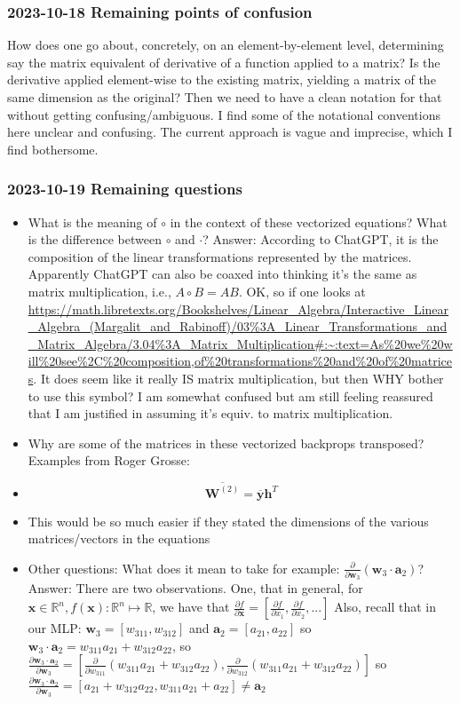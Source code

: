\documentclass{article}
\begin{document}
\subsubsection{2023-10-18 Remaining points of confusion} How does one go about, concretely, on an element-by-element
level, determining say the matrix equivalent of derivative of a function applied to a matrix? 
Is the derivative applied element-wise to the existing matrix, yielding a matrix of the same dimension as the original?
Then we need to have a clean notation for that without getting confusing/ambiguous. I find some of the notational
conventions here unclear and confusing. The current approach is vague and imprecise, which I find bothersome.
\subsubsection{2023-10-19 Remaining questions}
\begin{itemize}
    \item What is the meaning of $\circ$ in the context of these vectorized equations? What is the difference between $\circ$ and $\cdot$?
    Answer: According to ChatGPT, it is the composition of the linear transformations represented by the matrices.
    Apparently ChatGPT can also be coaxed into thinking it's the same as matrix multiplication, i.e., $A \circ B = AB$.
    OK, so if one looks at  \url{https://math.libretexts.org/Bookshelves/Linear_Algebra/Interactive_Linear_Algebra_(Margalit_and_Rabinoff)/03%3A_Linear_Transformations_and_Matrix_Algebra/3.04%3A_Matrix_Multiplication#:~:text=As%20we%20will%20see%2C%20composition,of%20transformations%20and%20of%20matrices}.
    It does seem like it really IS matrix multiplication, but then WHY bother to use this symbol? I am somewhat confused but am still feeling reassured that 
    I am justified in assuming it's equiv. to matrix multiplication.
    \item Why are some of the matrices in these vectorized backprops transposed? Examples from Roger Grosse:
    \item \[ \overline{\bm{W}^{(2)}} = \overline{\bm{y}}\bm{h}^{T} \]
    \item This would be so much easier if they stated the dimensions of the various matrices/vectors in the equations
    \item Other questions: What does it mean to take for example: $\frac{\partial}{\partial{\bm{w}_3}} (\bm{w}_3 \cdot \bm{a}_2)$?
    Answer: There are two observations. One, that in general, for $\bm{x} \in \mathbb{R}^n, f(\bm{x}): \mathbb{R}^n \mapsto \mathbb{R}$,
    we have that $\frac{\partial{f}}{\partial{\bm{x}}} = [\frac{\partial{f}}{\partial{x_1}}, \frac{\partial{f}}{\partial{x_2}}, ...]$
    Also, recall that in our MLP: $\bm{w}_3 = [w_{311}, w_{312}]$ and $\bm{a}_2 = [a_{21}, a_{22}]$
    so $\bm{w}_3 \cdot \bm{a}_2 = w_{311}a_{21} + w_{312}a_{22}$, 
    so $\frac{\partial{\bm{w}_3 \cdot \bm{a}_2}}{\partial{\bm{w}_3}} = [\frac{\partial{}}{\partial{w_{311}}} (w_{311}a_{21} + w_{312}a_{22}), \frac{\partial}{\partial{w_{312}}}(w_{311}a_{21} + w_{312}a_{22})]$
    so $\frac{\partial{\bm{w}_3 \cdot \bm{a}_2}}{\partial{\bm{w}_3}} = [a_{21} + w_{312}a_{22}, w_{311}a_{21} + a_{22}] \neq \bm{a}_2$


\end{itemize}
\end{document}
